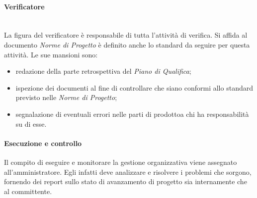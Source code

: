 			\paragraph*{Verificatore}\mbox{}\\ [1mm]
				La figura del verificatore è responsabile di tutta l'attività di verifica.
				Si affida al documento \textit{Norme di Progetto} è definito anche lo standard da seguire per questa attività.
				Le sue mansioni sono:
				\begin{itemize}
					\item redazione della parte retrospettiva del \textit{Piano di Qualifica};
					\item ispezione dei documenti al fine di controllare che siano conformi allo standard previsto nelle \textit{Norme di Progetto};
					\item segnalazione di eventuali errori nelle parti di prodotto\glosp a chi ha responsabilità su di esse.
				\end{itemize}
			\paragraph{Esecuzione e controllo}
				Il compito di eseguire e monitorare la gestione organizzativa viene assegnato all'amministratore. Egli infatti deve analizzare e risolvere i problemi che sorgono, fornendo dei report sullo stato di avanzamento di progetto sia internamente che al committente.	
